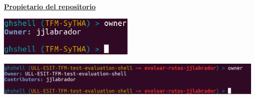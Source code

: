 \documentclass{beamer}
\begin{document}
\begin{frame}[allowframebreaks]
  \underline{{\bfseries Propietario del repositorio}}
  \bigskip
      
   \begin{center}
  	\includegraphics[width=0.5\textwidth]{images/owner1-1.eps}
   \end{center}
   \begin{center}
  	\includegraphics[width=1\textwidth]{images/owner1-2.eps}
  \end{center}
     
\end{frame}

\end{document}
